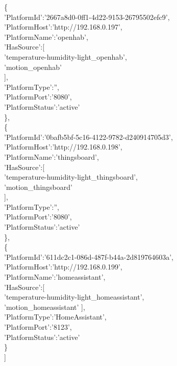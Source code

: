 \blank{1cm}\{\\
\blank{2cm}'PlatformId':'2667a8d0-0ff1-4d22-9153-26795502efc9',\\
\blank{2cm}'PlatformHost':'http://192.168.0.197',\\
\blank{2cm}'PlatformName':'openhab',\\
\blank{2cm}'HasSource':[\\
\blank{3cm}'temperature-humidity-light\_openhab',\\
\blank{3cm}'motion\_openhab'\\
\blank{3cm}],\\
\blank{2cm}'PlatformType':'',\\
\blank{2cm}'PlatformPort':'8080',\\
\blank{2cm}'PlatformStatus':'active'\\
\blank{1cm}\},\\
\blank{1cm}\{\\
\blank{2cm}'PlatformId':'0bafb5bf-5c16-4122-9782-d240914705d3',\\
\blank{2cm}'PlatformHost':'http://192.168.0.198',\\
\blank{2cm}'PlatformName':'thingsboard',\\
\blank{2cm}'HasSource':[\\
\blank{3cm}'temperature-humidity-light\_thingsboard',\\
\blank{3cm}'motion\_thingsboard'\\
\blank{2cm}],\\
\blank{2cm}'PlatformType':'',\\
\blank{2cm}'PlatformPort':'8080',\\
\blank{2cm}'PlatformStatus':'active'\\
\blank{1cm}\},\\
\blank{1cm}\{\\
\blank{2cm}'PlatformId':'611dc2c1-086d-487f-b44a-2d819764603a',\\
\blank{2cm}'PlatformHost':'http://192.168.0.199',\\
\blank{2cm}'PlatformName':'homeassistant',\\
\blank{2cm}'HasSource':[\\
\blank{3cm}'temperature-humidity-light\_homeassistant',\\
\blank{3cm}'motion\_homeassistant'
\blank{2cm}],\\
\blank{2cm}'PlatformType':'HomeAssistant',\\
\blank{2cm}'PlatformPort':'8123',\\
\blank{2cm}'PlatformStatus':'active'\\
\blank{1cm}\}\\
]

